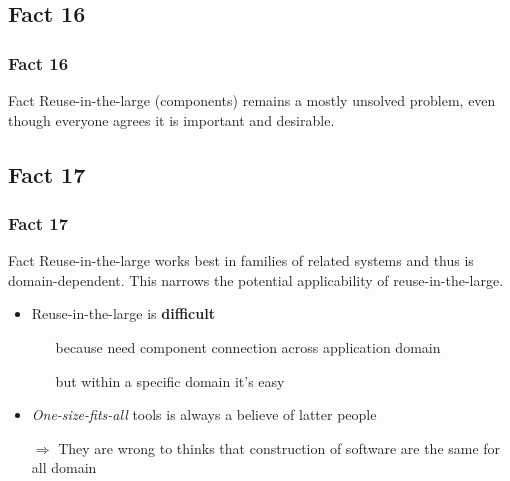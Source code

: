 \documentclass{beamer}
\begin{document}
\subsection{Fact 16}
\begin{frame}
    \frametitle{Fact 16}
    \begin{block}{Fact}
    Reuse-in-the-large (components) remains a mostly unsolved problem, even
    though everyone agrees it is important and desirable.
    \end{block}
\end{frame}

\subsection{Fact 17}
\begin{frame}
    \frametitle{Fact 17}
    \begin{block}{Fact}
    Reuse-in-the-large works best in families of related systems and thus is
    domain-dependent. This narrows the potential applicability of
    reuse-in-the-large.
    \end{block}
    
    \begin{itemize}

    \item Reuse-in-the-large is \textbf{difficult} 
    \begin{itemize}
        \item[\alert{because}] need component connection across
            application domain
        \item[\alert{but}] within a specific domain it's easy
    \end{itemize}

    \item \textit{One-size-fits-all} tools is always a believe of latter
    people  

        $\Rightarrow$ They are wrong to thinks that construction of
        software are the same for all domain

        \end{itemize}

\end{frame}
\end{document}
